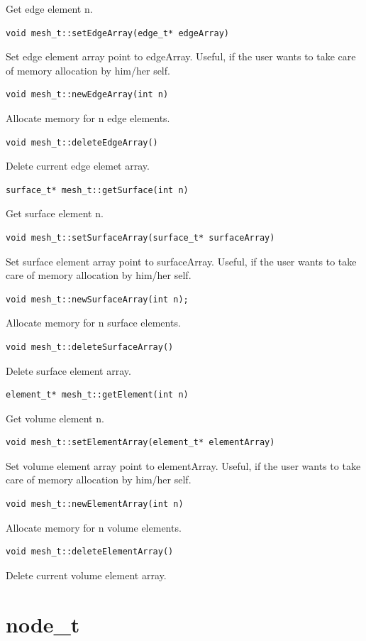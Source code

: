 Get edge element n.
\begin{verbatim}
void mesh_t::setEdgeArray(edge_t* edgeArray)
\end{verbatim}
Set edge element array point to edgeArray. Useful, if the user wants to take care of memory allocation by him/her self.
\begin{verbatim} 
void mesh_t::newEdgeArray(int n)
\end{verbatim}
Allocate memory for n edge elements.
\begin{verbatim}
void mesh_t::deleteEdgeArray()
\end{verbatim}
Delete current edge elemet array.
\begin{verbatim}
surface_t* mesh_t::getSurface(int n)
\end{verbatim}
Get surface element n.
\begin{verbatim}
void mesh_t::setSurfaceArray(surface_t* surfaceArray)
\end{verbatim}
Set surface element array point to surfaceArray. Useful, if the user wants to take care of memory allocation by him/her self.
\begin{verbatim} 
void mesh_t::newSurfaceArray(int n);
\end{verbatim}
Allocate memory for n surface elements.
\begin{verbatim}
void mesh_t::deleteSurfaceArray()
\end{verbatim}
Delete surface element array.
\begin{verbatim}
element_t* mesh_t::getElement(int n)
\end{verbatim}
Get volume element n.
\begin{verbatim}
void mesh_t::setElementArray(element_t* elementArray)
\end{verbatim}
Set volume element array point to elementArray. Useful, if the user wants to take care of memory allocation by him/her self.
\begin{verbatim} 
void mesh_t::newElementArray(int n)
\end{verbatim}
Allocate memory for n volume elements.
\begin{verbatim} 
void mesh_t::deleteElementArray()
\end{verbatim}
Delete current volume element array.

\section{node\_t}

